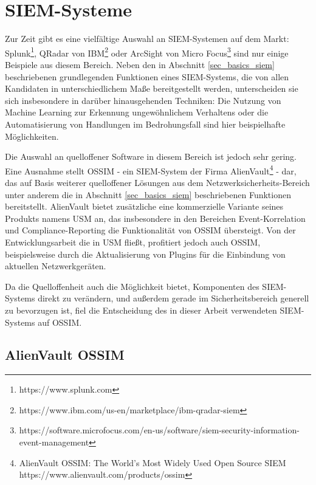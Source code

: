 \section{SIEM-Systeme}

\label{sec_state_siem}

Zur Zeit gibt es eine vielfältige Auswahl an SIEM-Systemen auf dem Markt: Splunk\footnote{
  https://www.splunk.com
}, QRadar von IBM\footnote{
  https://www.ibm.com/us-en/marketplace/ibm-qradar-siem
} oder ArcSight von Micro Focus\footnote{
  https://software.microfocus.com/en-us/software/siem-security-information-event-management
} sind nur einige Beispiele aus diesem Bereich. Neben den in Abschnitt \ref{sec_basics_siem} beschriebenen grundlegenden Funktionen eines SIEM-Systems, die von allen Kandidaten in unterschiedlichem Maße bereitgestellt werden, unterscheiden sie sich insbesondere in darüber hinausgehenden Techniken: Die Nutzung von Machine Learning zur Erkennung ungewöhnlichem Verhaltens oder die Automatisierung von Handlungen im Bedrohungsfall sind hier beispielhafte Möglichkeiten.

Die Auswahl an quelloffener Software in diesem Bereich ist jedoch sehr gering. Eine Ausnahme stellt OSSIM - ein SIEM-System der Firma AlienVault\footnote{
	AlienVault OSSIM: The World’s Most Widely Used Open Source SIEM\\https://www.alienvault.com/products/ossim
} - dar, das auf Basis weiterer quelloffener Lösungen aus dem Netzwerksicherheits-Bereich unter anderem die in Abschnitt \ref{sec_basics_siem} beschriebenen Funktionen bereitstellt. AlienVault bietet zusätzliche eine kommerzielle Variante seines Produkts namens USM an, das insbesondere in den Bereichen Event-Korrelation und Compliance-Reporting die Funktionalität von OSSIM übersteigt. Von der Entwicklungsarbeit die in USM fließt, profitiert jedoch auch OSSIM, beispielsweise durch die Aktualisierung von Plugins für die Einbindung von aktuellen Netzwerkgeräten.

Da die Quelloffenheit auch die Möglichkeit bietet, Komponenten des SIEM-Systems direkt zu verändern, und außerdem gerade im Sicherheitsbereich generell zu bevorzugen ist, fiel die Entscheidung des in dieser Arbeit verwendeten SIEM-Systems auf OSSIM.

\subsection{AlienVault OSSIM}

\label{subsec_state_siem_overview}

